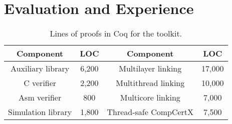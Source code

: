 \section{Evaluation and Experience}
\label{sec:kernel}

\begin{table}[t]
\caption{Lines of proofs in Coq for the toolkit.}
\vspace{-5pt}
\begin{center}
\begin{small}
\renewcommand{\arraystretch}{1} 
\begin{tabular}{|c|c||c|c|}
\hline
Component & LOC & Component & LOC \\
\hline
\hline
Auxiliary library & 6,200 & Multilayer linking & 17,000 \\
\hline
C verifier & 2,200 & Multithread linking & 10,000 \\
\hline
Asm verifier & 800 & Multicore linking & 7,000 \\
\hline
Simulation library & 1,800 & Thread-safe CompCertX & 7,500\\
\hline
\end{tabular}
\end{small}
\end{center}
\label{table:toolkit}
\vspace{-5pt}
\end{table}


